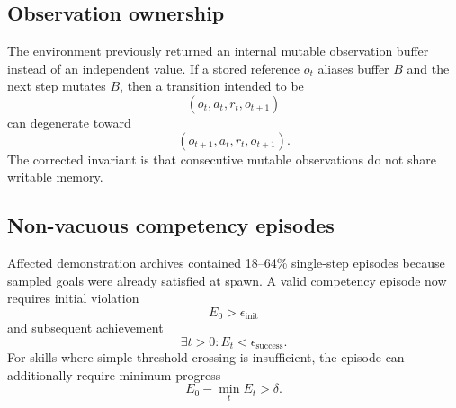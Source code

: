 \documentclass[11pt]{article}
\begin{document}
\subsection{Observation ownership}
The environment previously returned an internal mutable observation buffer instead of an independent value. If a stored reference $o_t$ aliases buffer $B$ and the next step mutates $B$, then a transition intended to be
\begin{equation}
(o_t,a_t,r_t,o_{t+1})
\end{equation}
can degenerate toward
\begin{equation}
(o_{t+1},a_t,r_t,o_{t+1}).
\end{equation}
The corrected invariant is that consecutive mutable observations do not share writable memory.

\subsection{Non-vacuous competency episodes}
Affected demonstration archives contained 18--64\% single-step episodes because sampled goals were already satisfied at spawn. A valid competency episode now requires initial violation
\begin{equation}
E_0>\epsilon_{\mathrm{init}}
\end{equation}
and subsequent achievement
\begin{equation}
\exists t>0:E_t<\epsilon_{\mathrm{success}}.
\end{equation}
For skills where simple threshold crossing is insufficient, the episode can additionally require minimum progress
\begin{equation}
E_0-\min_t E_t>\delta.
\end{equation}
\end{document}
